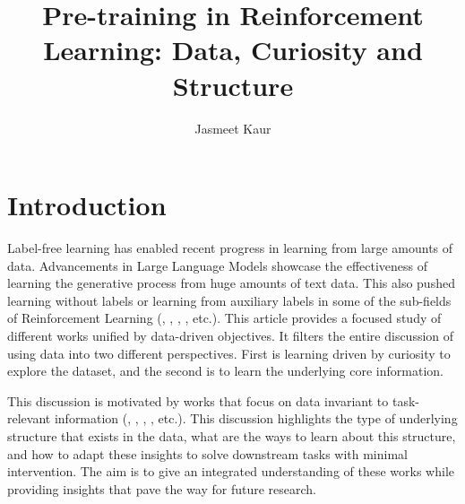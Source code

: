 \documentclass{article}
\title{Pre-training in Reinforcement Learning: Data, Curiosity and Structure}
\author{ Jasmeet Kaur \\ 
}
\date{}
\begin{document}
\maketitle




\section{Introduction}

Label-free learning has enabled recent progress in learning from large amounts of data. Advancements in Large Language Models showcase the effectiveness of learning the generative process from huge amounts of text data. This also pushed learning without labels or learning from auxiliary labels in some of the sub-fields of Reinforcement Learning (\cite{park2024foundation}, \cite{rudolph2024learning}, \cite{li2023accelerating}, \cite{ma2022vip}, etc.). This article provides a focused study of different works unified by data-driven objectives. It filters the entire discussion of using data into two different perspectives. First is learning driven by curiosity to explore the dataset, and the second is to learn the underlying core information.

This discussion is motivated by works that focus on data invariant to task-relevant information (\cite{zisselman2023explore}, \cite{wilcoxson2024leveraging}, \cite{rudolph2024learning}, \cite{laskin2020curl}, etc.). This discussion highlights the type of underlying structure that exists in the data, what are the ways to learn about this structure, and how to adapt these insights to solve downstream tasks with minimal intervention. The aim is to give an integrated understanding of these works while providing insights that pave the way for future research. 
\end{document}
